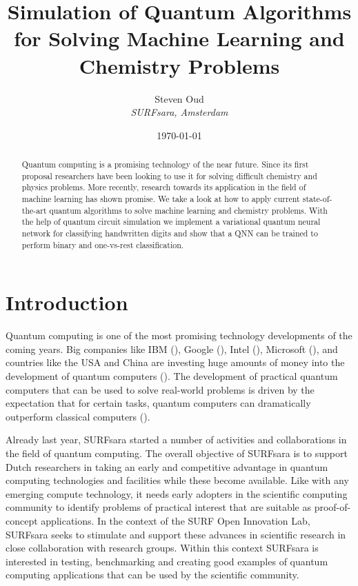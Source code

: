 \documentclass[a4paper,10pt]{article}
\title{Simulation of Quantum Algorithms for Solving Machine Learning and Chemistry Problems}
\author{Steven Oud \\ \emph{SURFsara, Amsterdam}}
\date{\today}
\begin{document}
\maketitle

\begin{abstract}
Quantum computing is a promising technology of the near future.
Since its first proposal researchers have been looking to use it for solving difficult chemistry and physics problems.
More recently, research towards its application in the field of machine learning has shown promise.
We take a look at how to apply current state-of-the-art quantum algorithms to solve machine learning and chemistry problems.
With the help of quantum circuit simulation we implement a variational quantum neural network for classifying handwritten digits and show that a QNN can be trained to perform binary and one-vs-rest classification.
\end{abstract}

\tableofcontents

\section{Introduction}
Quantum computing is one of the most promising technology developments of the coming years.
Big companies like IBM (\cite{ibm-quantum}), Google (\cite{google-quantum}), Intel (\cite{intel-quantum}), Microsoft (\cite{microsoft-quantum}), and countries like the USA and China are investing huge amounts of money into the development of quantum computers (\cite{usa-quantum, china-quantum}).
The development of practical quantum computers that can be used to solve real-world problems is driven by the expectation that for certain tasks, quantum computers can dramatically outperform classical computers (\cite{preskill-qc}).

Already last year, SURFsara started a number of activities and collaborations in the field of quantum computing.
The overall objective of SURFsara is to support Dutch researchers in taking an early and competitive advantage in quantum computing technologies and facilities while these become available.
Like with any emerging compute technology, it needs early adopters in the scientific computing community to identify problems of practical interest that are suitable as proof-of-concept applications.
In the context of the SURF Open Innovation Lab, SURFsara seeks to stimulate and support these advances in scientific research in close collaboration with research groups.
Within this context SURFsara is interested in testing, benchmarking and creating good examples of quantum computing applications that can be used by the scientific community.
\end{document}
